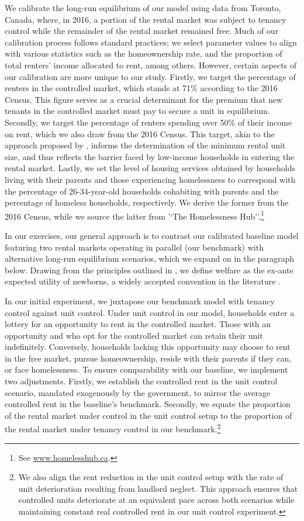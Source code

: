 \documentclass[parskip=full]{article}
\begin{document}
We calibrate the long-run equilibrium of our model using data from Toronto, Canada, where, in 2016, a portion of the rental market was subject to tenancy control while the remainder of the rental market remained free. Much of our calibration process follows standard practices; we select parameter values to align with various statistics such as the homeownership rate, and the proportion of total renters' income allocated to rent, among others. However, certain aspects of our calibration are more unique to our study. Firstly, we target the percentage of renters in the controlled market, which stands at 71\% according to the 2016 Census. This figure serves as a crucial determinant for the premium that new tenants in the controlled market must pay to secure a unit in equilibrium. Secondly, we target the percentage of renters spending over 50\% of their income on rent, which we also draw from the 2016 Census. This target, akin to the approach proposed by \citet{rs-2023}, informs the determination of the minimum rental unit size, and thus reflects the barrier faced by low-income households in entering the rental market. Lastly, we set the level of housing services obtained by households living with their parents and those experiencing homelessness to correspond with the percentage of 26-34-year-old households cohabiting with parents and the percentage of homeless households, respectively. We derive the former from the 2016 Census, while we source the latter from '`The Homelessness Hub''.\footnote{See \url{www.homelesshub.ca}.}

In our exercises, our general approach is to contrast our calibrated baseline model featuring two rental markets operating in parallel (our benchmark) with alternative long-run equilibrium scenarios, which we expand on in the paragraph below. Drawing from the principles outlined in \citet{ralws-1971}, we define welfare as the ex-ante expected utility of newborns, a widely accepted convention in the literature \citep{conesa-et-al,gkkoc}.

In our initial experiment, we juxtapose our benchmark model with tenancy control against unit control. Under unit control in our model, households enter a lottery for an opportunity to rent in the controlled market. Those with an opportunity and who opt for the controlled market can retain their unit indefinitely. Conversely, households lacking this opportunity may choose to rent in the free market, pursue homeownership, reside with their parents if they can, or face homelessness. To ensure comparability with our baseline, we implement two adjustments. Firstly, we establish the controlled rent in the unit control scenario, mandated exogenously by the government, to mirror the average controlled rent in the baseline's benchmark. Secondly, we equate the proportion of the rental market under control in the unit control setup to the proportion of the rental market under tenancy control in our benchmark.\footnote{We also align the rent reduction in the unit control setup with the rate of unit deterioration resulting from landlord neglect. This approach ensures that controlled units deteriorate at an equivalent pace across both scenarios while maintaining constant real controlled rent in our unit control experiment.}
\end{document}
